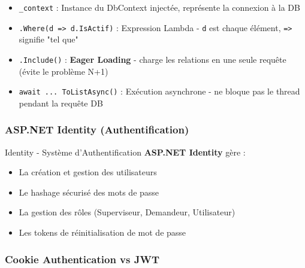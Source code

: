 \documentclass[12pt,a4paper]{article}
\begin{document}
\begin{infobox}[title={\faLightbulb\ Explication Ligne par Ligne}]
\begin{itemize}
    \item \texttt{\_context} : Instance du DbContext injectée, représente la connexion à la DB
    \item \texttt{.Where(d => d.IsActif)} : Expression Lambda - \texttt{d} est chaque élément, \texttt{=>} signifie "tel que"
    \item \texttt{.Include()} : \textbf{Eager Loading} - charge les relations en une seule requête (évite le problème N+1)
    \item \texttt{await ... ToListAsync()} : Exécution asynchrone - ne bloque pas le thread pendant la requête DB
\end{itemize}
\end{infobox}

\subsubsection{ASP.NET Identity (Authentification)}

\begin{defbox}{Identity - Système d'Authentification}
\textbf{ASP.NET Identity} gère :
\begin{itemize}
    \item La création et gestion des utilisateurs
    \item Le hashage sécurisé des mots de passe
    \item La gestion des rôles (Superviseur, Demandeur, Utilisateur)
    \item Les tokens de réinitialisation de mot de passe
\end{itemize}
\end{defbox}

\subsubsection{Cookie Authentication vs JWT}
\end{document}
